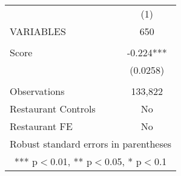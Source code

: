 \begin{tabular}{lc} \hline
 & (1) \\
VARIABLES & 650 \\ \hline
 &  \\
Score & -0.224*** \\
 & (0.0258) \\
 &  \\
Observations & 133,822 \\
Restaurant Controls & No \\
 Restaurant FE & No \\ \hline
\multicolumn{2}{c}{ Robust standard errors in parentheses} \\
\multicolumn{2}{c}{ *** p$<$0.01, ** p$<$0.05, * p$<$0.1} \\
\end{tabular}
